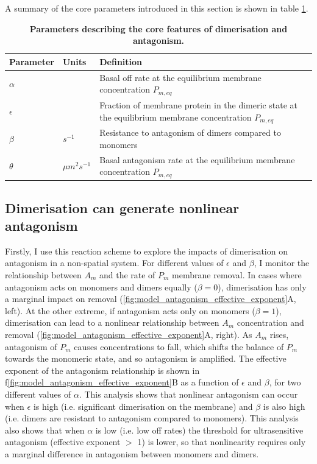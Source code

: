 \documentclass[12pt]{"report"}
\newcommand{\mycaption}[2]{\caption[#1]{\textbf{#1.} #2}}
\begin{document}
A summary of the core parameters introduced in this section is shown in table \ref{tab:dimer_model_parameter_definitions}.\\

\begin{table}[]
\begin{tabularx}{400pt}{|l|l|X|}
\hline
Parameter & Units & Definition \\ \hline
$\alpha$ &  & Basal off rate at the equilibrium membrane concentration $P_{m,eq}$ \\ \hline
$\epsilon$ &  & Fraction of membrane protein in the dimeric state at the equilibrium membrane concentration $P_{m,eq}$ \\ \hline
$\beta$ & $s^{-1}$ & Resistance to antagonism of dimers compared to monomers \\ \hline
$\theta$ & $\mu m^2 s^{-1}$ & Basal antagonism rate at the equilibrium membrane concentration $P_{m,eq}$ \\ \hline
\end{tabularx}
\mycaption{Parameters describing the core features of dimerisation and antagonism}{}
\label{tab:dimer_model_parameter_definitions}
\end{table}


\subsection{Dimerisation can generate nonlinear antagonism}

Firstly, I use this reaction scheme to explore the impacts of dimerisation on antagonism in a non-spatial system. For different values of $\epsilon$ and $\beta$, I monitor the relationship between $A_m$ and the rate of $P_m$ membrane removal. In cases where antagonism acts on monomers and dimers equally ($\beta = 0$), dimerisation has only a marginal impact on removal (\cref{fig:model_antagonism_effective_exponent}A, left). At the other extreme, if antagonism acts only on monomers ($\beta = 1$), dimerisation can lead to a nonlinear relationship between $A_m$ concentration and removal (\cref{fig:model_antagonism_effective_exponent}A, right). As $A_m$ rises, antagonism of $P_m$ causes concentrations to fall, which shifts the balance of $P_m$ towards the monomeric state, and so antagonism is amplified. The effective exponent of the antagonism relationship is shown in f\cref{fig:model_antagonism_effective_exponent}B as a function of $\epsilon$ and $\beta$, for two different values of $\alpha$. This analysis shows that nonlinear antagonism can occur when $\epsilon$ is high (i.e. significant dimerisation on the membrane) and $\beta$ is also high (i.e. dimers are resistant to antagonism compared to monomers). This analysis also shows that when $\alpha$ is low (i.e. low off rates) the threshold for ultrasensitive antagonism (effective exponent $>$ 1) is lower, so that nonlinearity requires only a marginal difference in antagonism between monomers and dimers. \\
\end{document}
